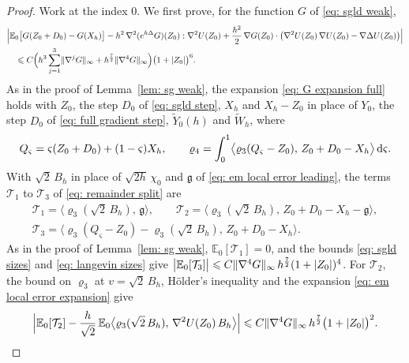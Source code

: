 \begin{proof}
    Work at the index $0$. We first prove, for the function $G$ of \eqref{eq: sgld weak},
    \begin{align}
        & \Bigl| \mathbb E_0\bigl[ G(Z_0 + D_0) - G(X_h) \bigr] - h^2\, \nabla^2 ( e^{h\Delta} G )(Z_0) : \nabla^2 U(Z_0) + \frac{h^2}{2}\, \nabla G(Z_0) \cdot \bigl( \nabla^2 U(Z_0)\, \nabla U(Z_0) - \nabla \Delta U(Z_0) \bigr) \Bigr| \notag \\
        & \quad \leqslant C \Bigl( h^3 \sum_{j=1}^{3} \lVert \nabla^j G \rVert_\infty + h^{\frac72} \lVert \nabla^4 G \rVert_\infty \Bigr) \bigl( 1 + |Z_0| \bigr)^6 .
        \label{eq: sgld em weak}
    \end{align}
    As in the proof of Lemma~\ref{lem: sg weak}, the expansion \eqref{eq: G expansion full} holds with $Z_0$, the step $D_0$ of \eqref{eq: sgld step}, $X_h$ and $X_h - Z_0$ in place of $Y_0$, the step $D_0$ of \eqref{eq: full gradient step}, $\tilde Y_0(h)$ and $\tilde W_h$, where
    \begin{equation*}
        Q_\varsigma = \varsigma (Z_0 + D_0) + (1 - \varsigma) X_h , \qquad \varrho_4 = \int_0^1 \bigl\langle \varrho_3(Q_\varsigma - Z_0),\, Z_0 + D_0 - X_h \bigr\rangle \,\mathrm{d}\varsigma .
    \end{equation*}
    With $\sqrt2\, B_h$ in place of $\sqrt{2h}\, \chi_0$ and $\mathfrak g$ of \eqref{eq: em local error leading}, the terms $\mathcal T_1$ to $\mathcal T_3$ of \eqref{eq: remainder split} are
    \begin{equation*}
    \begin{gathered}
        \mathcal T_1 = \bigl\langle \varrho_3(\sqrt2\, B_h),\, \mathfrak g \bigr\rangle , \qquad
        \mathcal T_2 = \bigl\langle \varrho_3(\sqrt2\, B_h),\, Z_0 + D_0 - X_h - \mathfrak g \bigr\rangle , \\
        \mathcal T_3 = \bigl\langle \varrho_3(Q_\varsigma - Z_0) - \varrho_3(\sqrt2\, B_h),\, Z_0 + D_0 - X_h \bigr\rangle .
    \end{gathered}
    \end{equation*}
    As in the proof of Lemma~\ref{lem: sg weak}, $\mathbb E_0[\mathcal T_1] = 0$, and the bounds \eqref{eq: sgld sizes} and \eqref{eq: langevin sizes} give $\bigl| \mathbb E_0[\mathcal T_3] \bigr| \leqslant C \lVert \nabla^4 G \rVert_\infty\, h^{\frac72} ( 1 + |Z_0| )^4$. For $\mathcal T_2$, the bound on $\varrho_3$ at $v = \sqrt2\, B_h$, H\"older's inequality and the expansion \eqref{eq: em local error expansion} give
    \begin{equation*}
        \Bigl| \mathbb E_0[\mathcal T_2] - \frac{h}{\sqrt2}\, \mathbb E_0 \bigl\langle \varrho_3(\sqrt2\, B_h),\, \nabla^2 U(Z_0)\, B_h \bigr\rangle \Bigr| \Le C \norm{\nabla^4 G}_\infty\, h^{\frac72} \bigl( 1 + |Z_0| \bigr)^2 .

\end{equation*}
\end{proof}
